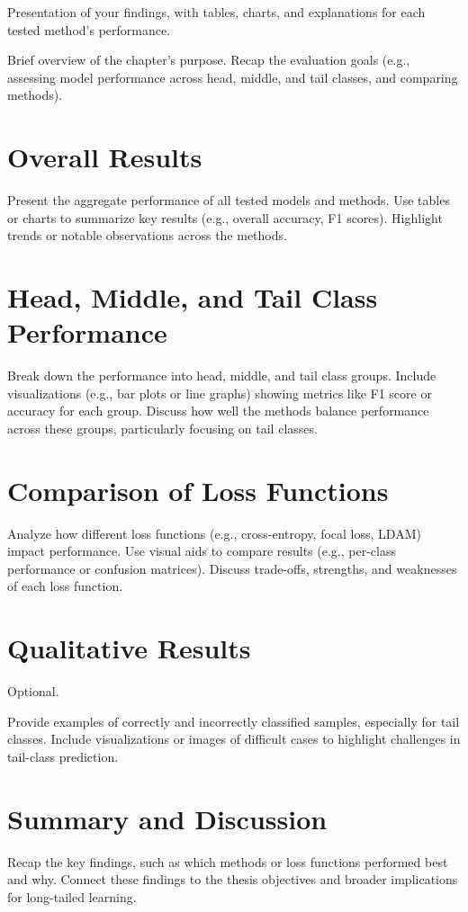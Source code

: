 
Presentation of your findings, with tables, charts, and explanations for each tested method's performance.

Brief overview of the chapter’s purpose.
Recap the evaluation goals (e.g., assessing model performance across head, middle, and tail classes, and comparing methods).

\section{Overall Results}

Present the aggregate performance of all tested models and methods.
Use tables or charts to summarize key results (e.g., overall accuracy, F1 scores).
Highlight trends or notable observations across the methods.

\section{Head, Middle, and Tail Class Performance}
Break down the performance into head, middle, and tail class groups.
Include visualizations (e.g., bar plots or line graphs) showing metrics like F1 score or accuracy for each group.
Discuss how well the methods balance performance across these groups, particularly focusing on tail classes.

\section{Comparison of Loss Functions}
Analyze how different loss functions (e.g., cross-entropy, focal loss, LDAM) impact performance.
Use visual aids to compare results (e.g., per-class performance or confusion matrices).
Discuss trade-offs, strengths, and weaknesses of each loss function.

\section{Qualitative Results}
Optional.

Provide examples of correctly and incorrectly classified samples, especially for tail classes.
Include visualizations or images of difficult cases to highlight challenges in tail-class prediction.



\section{Summary and Discussion}
Recap the key findings, such as which methods or loss functions performed best and why.
Connect these findings to the thesis objectives and broader implications for long-tailed learning.